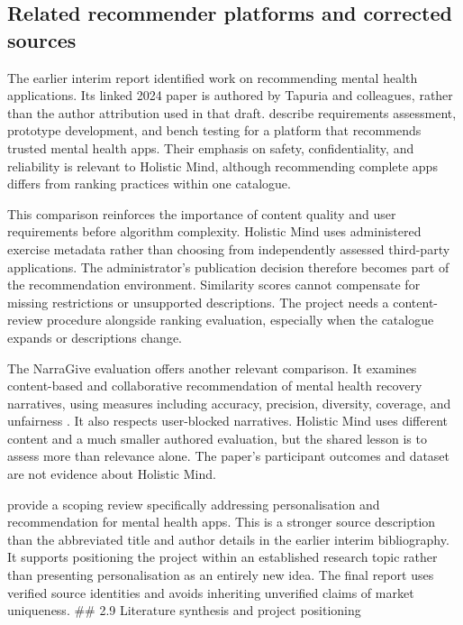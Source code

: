 \subsection{Related recommender platforms and corrected sources}

The earlier interim report identified work on recommending mental health applications. Its linked 2024 paper is authored by Tapuria and colleagues, rather than the author attribution used in that draft. \citet{tapuria2024} describe requirements assessment, prototype development, and bench testing for a platform that recommends trusted mental health apps. Their emphasis on safety, confidentiality, and reliability is relevant to Holistic Mind, although recommending complete apps differs from ranking practices within one catalogue.

This comparison reinforces the importance of content quality and user requirements before algorithm complexity. Holistic Mind uses administered exercise metadata rather than choosing from independently assessed third-party applications. The administrator's publication decision therefore becomes part of the recommendation environment. Similarity scores cannot compensate for missing restrictions or unsupported descriptions. The project needs a content-review procedure alongside ranking evaluation, especially when the catalogue expands or descriptions change.

The NarraGive evaluation offers another relevant comparison. It examines content-based and collaborative recommendation of mental health recovery narratives, using measures including accuracy, precision, diversity, coverage, and unfairness \citep{slade2024}. It also respects user-blocked narratives. Holistic Mind uses different content and a much smaller authored evaluation, but the shared lesson is to assess more than relevance alone. The paper's participant outcomes and dataset are not evidence about Holistic Mind.

\citet{matthews2025} provide a scoping review specifically addressing personalisation and recommendation for mental health apps. This is a stronger source description than the abbreviated title and author details in the earlier interim bibliography. It supports positioning the project within an established research topic rather than presenting personalisation as an entirely new idea. The final report uses verified source identities and avoids inheriting unverified claims of market uniqueness.
\#\# 2.9 Literature synthesis and project positioning

